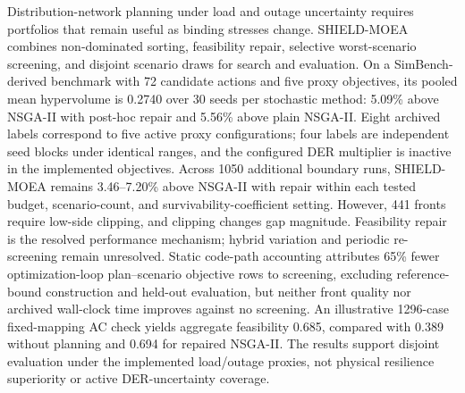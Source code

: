 Distribution-network planning under load and outage uncertainty requires portfolios that remain useful as binding stresses change. SHIELD-MOEA combines non-dominated sorting, feasibility repair, selective worst-scenario screening, and disjoint scenario draws for search and evaluation. On a SimBench-derived benchmark with 72 candidate actions and five proxy objectives, its pooled mean hypervolume is 0.2740 over 30 seeds per stochastic method: 5.09\% above NSGA-II with post-hoc repair and 5.56\% above plain NSGA-II. Eight archived labels correspond to five active proxy configurations; four labels are independent seed blocks under identical ranges, and the configured DER multiplier is inactive in the implemented objectives. Across 1050 additional boundary runs, SHIELD-MOEA remains 3.46--7.20\% above NSGA-II with repair within each tested budget, scenario-count, and survivability-coefficient setting. However, 441 fronts require low-side clipping, and clipping changes gap magnitude. Feasibility repair is the resolved performance mechanism; hybrid variation and periodic re-screening remain unresolved. Static code-path accounting attributes 65\% fewer optimization-loop plan--scenario objective rows to screening, excluding reference-bound construction and held-out evaluation, but neither front quality nor archived wall-clock time improves against no screening. An illustrative 1296-case fixed-mapping AC check yields aggregate feasibility 0.685, compared with 0.389 without planning and 0.694 for repaired NSGA-II. The results support disjoint evaluation under the implemented load/outage proxies, not physical resilience superiority or active DER-uncertainty coverage.
